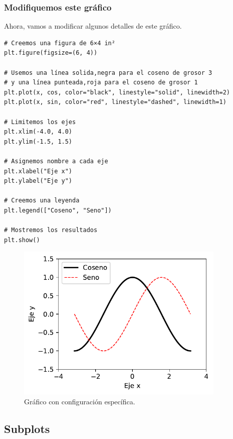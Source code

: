\subsubsection{Modifiquemos este
gráfico}

Ahora, vamos a modificar algunos detalles de este gráfico.

\begin{listing}[H]
\begin{verbatim}
# Creemos una figura de 6×4 in²
plt.figure(figsize=(6, 4))

# Usemos una línea solida,negra para el coseno de grosor 3
# y una línea punteada,roja para el coseno de grosor 1
plt.plot(x, cos, color="black", linestyle="solid", linewidth=2)
plt.plot(x, sin, color="red", linestyle="dashed", linewidth=1)

# Limitemos los ejes
plt.xlim(-4.0, 4.0)
plt.ylim(-1.5, 1.5)

# Asignemos nombre a cada eje
plt.xlabel("Eje x")
plt.ylabel("Eje y")

# Creemos una leyenda
plt.legend(["Coseno", "Seno"])

# Mostremos los resultados
plt.show()
\end{verbatim}
\end{listing}

\begin{figure}[H]
	\centering
	\includegraphics[width=10cm]{img/herramientas/grafico_sencillo_mejorado}
	\caption{Gráfico con configuración específica.}
	\label{fig:graficosencillo2}
\end{figure}

\subsection{Subplots}

